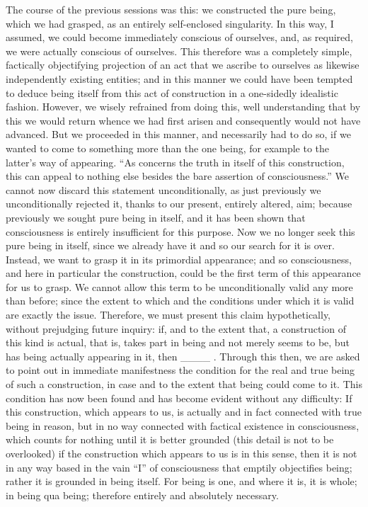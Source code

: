 The course of the previous sessions was this:
we constructed the pure being, which we had grasped,
as an entirely self-enclosed singularity.
In this way, I assumed, we could become
immediately conscious of ourselves,
and, as required, we were actually conscious of ourselves.
This therefore was a completely simple,
factically objectifying projection of
an act that we ascribe to ourselves
as likewise independently existing entities;
and in this manner we could have been tempted
to deduce being itself from this act of
construction in a one-sidedly idealistic fashion.
However, we wisely refrained from doing this,
well understanding that by this
we would return whence we had first arisen
and consequently would not have advanced.
But we proceeded in this manner,
and necessarily had to do so,
if we wanted to come to something
more than the one being,
for example to the latter's way of appearing.
“As concerns the truth in itself of this construction,
this can appeal to nothing else besides
the bare assertion of consciousness.”
We cannot now discard this statement unconditionally,
as just previously we unconditionally rejected it,
thanks to our present, entirely altered, aim;
because previously we sought pure being in itself,
and it has been shown that consciousness is
entirely insufficient for this purpose.
Now we no longer seek this pure being in itself,
since we already have it
and so our search for it is over.
Instead, we want to grasp it in its primordial appearance;
and so consciousness, and here in particular the construction,
could be the first term of this appearance for us to grasp.
We cannot allow this term to be unconditionally valid
any more than before;
since the extent to which and the conditions under which
it is valid are exactly the issue.
Therefore, we must present this claim hypothetically,
without prejudging future inquiry:
if, and to the extent that, a construction of this kind is actual,
that is, takes part in being and not merely seems to be,
but has being actually appearing in it, then ____ .
Through this then, we are asked to point out
in immediate manifestness the condition for
the real and true being of such a construction,
in case and to the extent that being could come to it.
This condition has now been found and has become
evident without any difficulty:
If this construction, which appears to us,
is actually and in fact connected with true being in reason,
but in no way connected with factical existence in consciousness,
which counts for nothing until it is better grounded
(this detail is not to be overlooked)
if the construction which appears to us is in this sense,
then it is not in any way based in the vain “I”
of consciousness that emptily objectifies being;
rather it is grounded in being itself.
For being is one, and where it is, it is whole; in being qua being;
therefore entirely and absolutely necessary.

